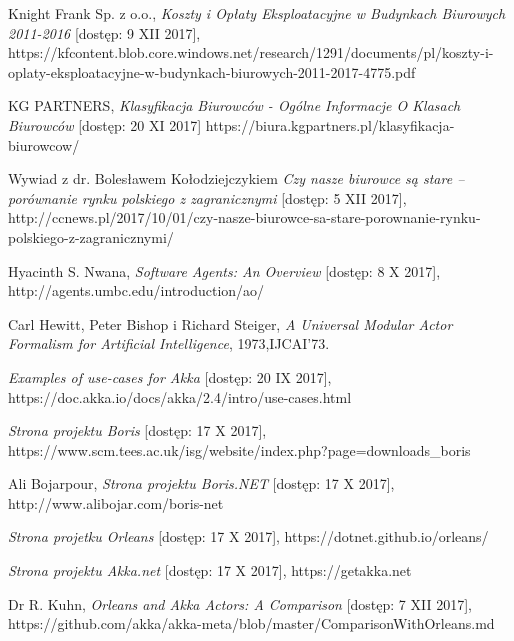\begin{thebibliography}{10}%


Knight Frank Sp. z o.o., \emph{Koszty i Opłaty Eksploatacyjne w Budynkach Biurowych 2011-2016} [dostęp: 9 XII 2017],
https://kfcontent.blob.core.windows.net/research/1291/documents/pl/koszty-i-oplaty-eksploatacyjne-w-budynkach-biurowych-2011-2017-4775.pdf

 KG PARTNERS, \emph{Klasyfikacja Biurowców - Ogólne Informacje O Klasach Biurowców} [dostęp: 20 XI 2017]
https://biura.kgpartners.pl/klasyfikacja-biurowcow/

 Wywiad z dr. Bolesławem Kołodziejczykiem \emph{Czy nasze biurowce są stare – porównanie rynku polskiego z zagranicznymi} [dostęp: 5 XII 2017],
http://ccnews.pl/2017/10/01/czy-nasze-biurowce-sa-stare-porownanie-rynku-polskiego-z-zagranicznymi/

 Hyacinth S. Nwana, \emph{Software Agents: An Overview} [dostęp: 8 X 2017],
http://agents.umbc.edu/introduction/ao/

 Carl Hewitt, Peter Bishop i Richard Steiger, \emph{A Universal Modular Actor Formalism for Artificial Intelligence}, 1973,IJCAI'73.

 \emph{Examples of use-cases for Akka} [dostęp: 20 IX 2017],
https://doc.akka.io/docs/akka/2.4/intro/use-cases.html

 \emph{Strona projektu Boris} [dostęp: 17 X 2017],
https://www.scm.tees.ac.uk/isg/website/index.php?page=downloads\_boris

 Ali Bojarpour, \emph{Strona projektu Boris.NET} [dostęp: 17 X 2017],
http://www.alibojar.com/boris-net

 \emph{Strona projetku Orleans} [dostęp: 17 X 2017],
https://dotnet.github.io/orleans/

 \emph{Strona projektu Akka.net} [dostęp: 17 X 2017],
https://getakka.net

Dr R. Kuhn, \emph{Orleans and Akka Actors: A Comparison} [dostęp: 7 XII 2017],
https://github.com/akka/akka-meta/blob/master/ComparisonWithOrleans.md


\end{thebibliography}
